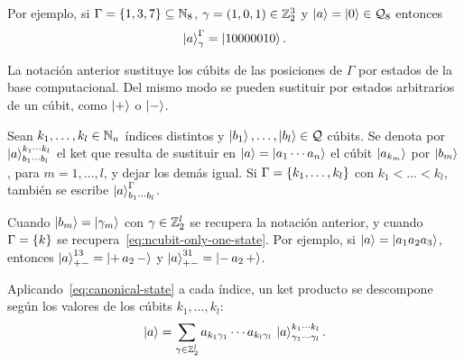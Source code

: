 Por ejemplo, si $\Gamma=\{1,3,7\}\subseteq \mathbb{N}_8$, $\gamma=(1,0,1)\in\mathbb{Z}_2^3$ y $\ket{a}=\ket{0}\in\mathcal{Q}_8$ entonces
\[
  \ket{a}^{\Gamma}_{\gamma}=\ket{10000010}.
\]

La notación anterior sustituye los cúbits de las posiciones de $\Gamma$ por estados de la base computacional. Del mismo modo se pueden sustituir por estados arbitrarios de un cúbit, como $\ket{+}$ o $\ket{-}$.

\begin{notation}
  \label{not:ket-estados}
  Sean $k_1,\dots,k_l\in\mathbb{N}_n$ índices distintos y $\ket{b_1},\dots,\ket{b_l}\in\mathcal{Q}$ cúbits. Se denota por $\ket{a}^{k_1\cdots k_l}_{b_1\cdots b_l}$ el ket que resulta de sustituir en $\ket{a}=\ket{a_1\cdots a_n}$ el cúbit $\ket{a_{k_m}}$ por $\ket{b_m}$, para $m=1,\dots,l$, y dejar los demás igual. Si $\Gamma=\{k_1,\dots,k_l\}$ con $k_1<\dots<k_l$, también se escribe $\ket{a}^{\Gamma}_{b_1\cdots b_l}$.
\end{notation}

Cuando $\ket{b_m}=\ket{\gamma_m}$ con $\gamma\in\mathbb{Z}_2^l$ se recupera la notación anterior, y cuando $\Gamma=\{k\}$ se recupera~\eqref{eq:ncubit-only-one-state}. Por ejemplo, si $\ket{a}=\ket{a_1a_2a_3}$, entonces $\ket{a}^{13}_{+-}=\ket{+\,a_2\,-}$ y $\ket{a}^{31}_{+-}=\ket{-\,a_2\,+}$.

Aplicando~\eqref{eq:canonical-state} a cada índice, un ket producto se descompone según los valores de los cúbits $k_1,\dots,k_l$:
\begin{equation}
  \label{eq:descomposicion-indices}
  \ket{a}=\sum_{\gamma\in\mathbb{Z}_2^l} a_{k_1\gamma_1}\cdots a_{k_l\gamma_l}\,\ket{a}^{k_1\cdots k_l}_{\gamma_1\cdots\gamma_l}.
\end{equation}

